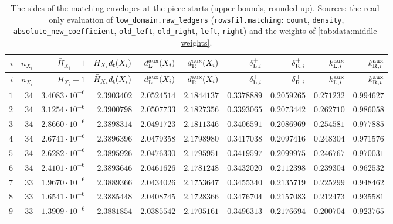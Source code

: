 {\scriptsize\setlength{\tabcolsep}{3pt}\renewcommand{\arraystretch}{0.92}
\begin{longtable}{@{}rrrrrrrrrr@{}}
\caption{The sides of the matching envelopes at the piece starts (upper bounds, rounded up). Sources: the read-only evaluation of \texttt{low\_domain.raw\_ledgers} (\texttt{rows[i].matching}: \texttt{count}, \texttt{density}, \texttt{absolute\_new\_coefficient}, \texttt{old\_left}, \texttt{old\_right}, \texttt{left}, \texttt{right}) and the weights of \cref{tab:data:middle-weights}.}\label{tab:data:sides}\\
\toprule
$i$ & $n_{X_i}$ & $\bar H_{X_i}-1$ & $\bar H_{X_i}d_\mathsf t(X_i)$ & $d^{\rm aux}_{\rm L}(X_i)$ & $d^{\rm aux}_{\rm R}(X_i)$ & $\delta^+_{{\rm L},i}$ & $\delta^+_{{\rm R},i}$ & $k^{\rm aux}_{{\rm L},i}$ & $k^{\rm aux}_{{\rm R},i}$\\
\midrule
\endfirsthead
\toprule
$i$ & $n_{X_i}$ & $\bar H_{X_i}-1$ & $\bar H_{X_i}d_\mathsf t(X_i)$ & $d^{\rm aux}_{\rm L}(X_i)$ & $d^{\rm aux}_{\rm R}(X_i)$ & $\delta^+_{{\rm L},i}$ & $\delta^+_{{\rm R},i}$ & $k^{\rm aux}_{{\rm L},i}$ & $k^{\rm aux}_{{\rm R},i}$\\
\midrule
\endhead
\bottomrule
\endfoot
$1$ & $34$ & $3.4083\cdot10^{-6}$ & $2.3903402$ & $2.0524514$ & $2.1844137$ & $0.3378889$ & $0.2059265$ & $0.271232$ & $0.994627$\\
$2$ & $34$ & $3.1254\cdot10^{-6}$ & $2.3900798$ & $2.0507733$ & $2.1827356$ & $0.3393065$ & $0.2073442$ & $0.262710$ & $0.986058$\\
$3$ & $34$ & $2.8660\cdot10^{-6}$ & $2.3898314$ & $2.0491723$ & $2.1811346$ & $0.3406591$ & $0.2086969$ & $0.254581$ & $0.977885$\\
$4$ & $34$ & $2.6741\cdot10^{-6}$ & $2.3896396$ & $2.0479358$ & $2.1798980$ & $0.3417038$ & $0.2097416$ & $0.248304$ & $0.971576$\\
$5$ & $34$ & $2.6282\cdot10^{-6}$ & $2.3895926$ & $2.0476330$ & $2.1795951$ & $0.3419597$ & $0.2099975$ & $0.246767$ & $0.970031$\\
$6$ & $34$ & $2.4101\cdot10^{-6}$ & $2.3893646$ & $2.0461626$ & $2.1781248$ & $0.3432020$ & $0.2112398$ & $0.239304$ & $0.962532$\\
$7$ & $33$ & $1.9670\cdot10^{-6}$ & $2.3889366$ & $2.0434026$ & $2.1753647$ & $0.3455340$ & $0.2135719$ & $0.225299$ & $0.948462$\\
$8$ & $33$ & $1.6541\cdot10^{-6}$ & $2.3885448$ & $2.0408745$ & $2.1728366$ & $0.3476704$ & $0.2157083$ & $0.212473$ & $0.935581$\\
$9$ & $33$ & $1.3909\cdot10^{-6}$ & $2.3881854$ & $2.0385542$ & $2.1705161$ & $0.3496313$ & $0.2176694$ & $0.200704$ & $0.923765$\\

\end{longtable}}
